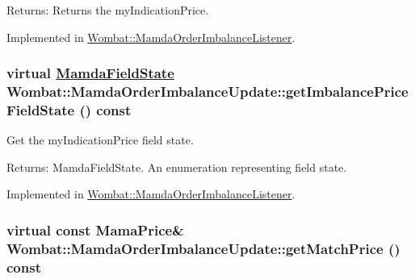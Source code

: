 \begin{Desc}
\item[Returns:]Returns the my\-Indication\-Price. \end{Desc}


Implemented in \hyperlink{classWombat_1_1MamdaOrderImbalanceListener_ecc32af60d82a040a0ca3e7c79075fc5}{Wombat::Mamda\-Order\-Imbalance\-Listener}.\hypertarget{classWombat_1_1MamdaOrderImbalanceUpdate_1d0439aaec9d8c23fdde521728658293}{
\subsubsection[getImbalancePriceFieldState]{\setlength{\rightskip}{0pt plus 5cm}virtual \hyperlink{namespaceWombat_93aac974f2ab713554fd12a1fa3b7d2a}{Mamda\-Field\-State} Wombat::Mamda\-Order\-Imbalance\-Update::get\-Imbalance\-Price\-Field\-State () const}}
\label{classWombat_1_1MamdaOrderImbalanceUpdate_1d0439aaec9d8c23fdde521728658293}


Get the my\-Indication\-Price field state. 

\begin{Desc}
\item[Returns:]Mamda\-Field\-State. An enumeration representing field state. \end{Desc}


Implemented in \hyperlink{classWombat_1_1MamdaOrderImbalanceListener_44f4f51fd6248a092825200e42c008a5}{Wombat::Mamda\-Order\-Imbalance\-Listener}.\hypertarget{classWombat_1_1MamdaOrderImbalanceUpdate_bb0c49b821a422064cb5a82fe5dc67af}{
\subsubsection[getMatchPrice]{\setlength{\rightskip}{0pt plus 5cm}virtual const Mama\-Price\& Wombat::Mamda\-Order\-Imbalance\-Update::get\-Match\-Price () const}}
\label{classWombat_1_1MamdaOrderImbalanceUpdate_bb0c49b821a422064cb5a82fe5dc67af}


